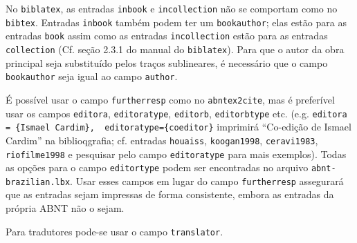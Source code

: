 \documentclass[a4paper]{article}
\begin{document}
\begin{itemize}
\begin{sloppypar}
    \item No \texttt{biblatex}, as entradas \texttt{inbook} e \texttt{incollection} não se comportam como no \texttt{bibtex}. Entradas \texttt{inbook} também podem ter um \texttt{bookauthor}; elas estão para as entradas \texttt{book} assim como as entradas \texttt{incollection} estão para as entradas \texttt{collection} (Cf. seção 2.3.1 do manual do \texttt{biblatex}). Para que o autor da obra principal seja substituído pelos traços sublineares, é necessário que o campo \texttt{bookauthor} seja igual ao campo \texttt{author}.
    \item É possível usar o campo \texttt{furtherresp} como no \texttt{abntex2cite}, mas é preferível usar os campos \texttt{editora}, \texttt{editoratype}, \texttt{editorb}, \texttt{editorbtype} etc. (e.g. \verb"editora = {Ismael Cardim},  editoratype={coeditor}" imprimirá ``Co-edição de Ismael Cardim'' na biblioqgrafia; cf. entradas \texttt{hou\-a\-iss}, \texttt{koogan1998}, \texttt{ceravi1983}, \texttt{riofilme1998} e pesquisar pelo campo \texttt{editor\-a\-type} para mais exemplos). Todas as opções para o campo \texttt{editor\-type} podem ser encontradas no arquivo \texttt{abnt-brazilian.lbx}. Usar esses campos em lugar do campo \texttt{furtherresp} assegurará que as entradas sejam impressas de forma consistente, embora as entradas da própria ABNT não o sejam.
    \item Para tradutores pode-se usar o campo \texttt{translator}.
\end{sloppypar}
\end{itemize}

\clearpage
\nocite{*}
\printbibliography
\end{document}
